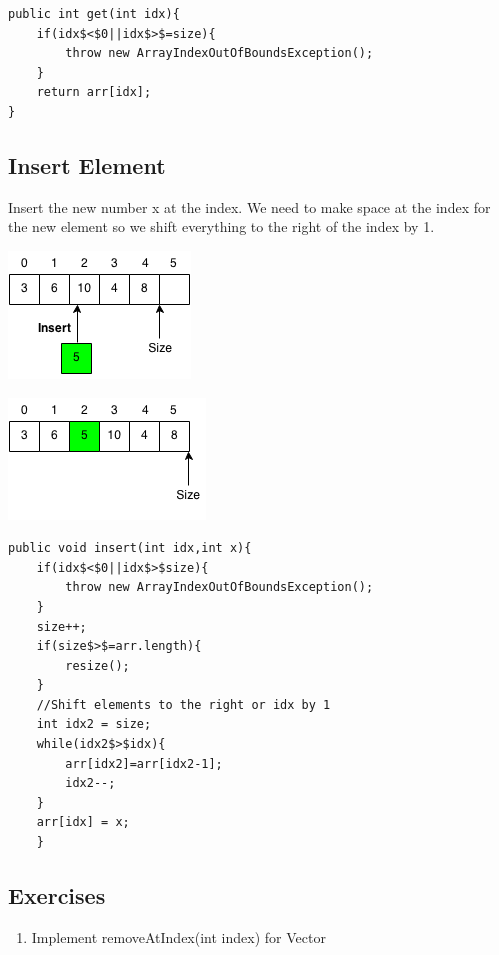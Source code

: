 \documentclass[11pt,oneside]{book}
\makeatletter
\def\maxwidth#1{\ifdim\Gin@nat@width>#1 #1\else\Gin@nat@width\fi}
\makeatother
\begin{document}
\begin{lstlisting}
public int get(int idx){
    if(idx$<$0||idx$>$=size){
        throw new ArrayIndexOutOfBoundsException();
    }   
    return arr[idx];
}
\end{lstlisting}

\subsection{Insert Element}

Insert the new number x at the index. We need to make space at the index for the new element so we shift everything to the right of the index by 1.

\includegraphics[width=\maxwidth{\textwidth}]{vectorinsert.png}

\includegraphics[width=\maxwidth{\textwidth}]{vectorinsert2.png}

\begin{lstlisting}
public void insert(int idx,int x){
    if(idx$<$0||idx$>$size){
        throw new ArrayIndexOutOfBoundsException();
    }
    size++;
    if(size$>$=arr.length){
        resize();
    }
    //Shift elements to the right or idx by 1
    int idx2 = size;
    while(idx2$>$idx){
        arr[idx2]=arr[idx2-1];
        idx2--;
    }   
    arr[idx] = x;
    }
\end{lstlisting}

\subsection{Exercises}

\begin{enumerate}
\item Implement removeAtIndex(int index) for Vector
\end{enumerate}
\end{document}
